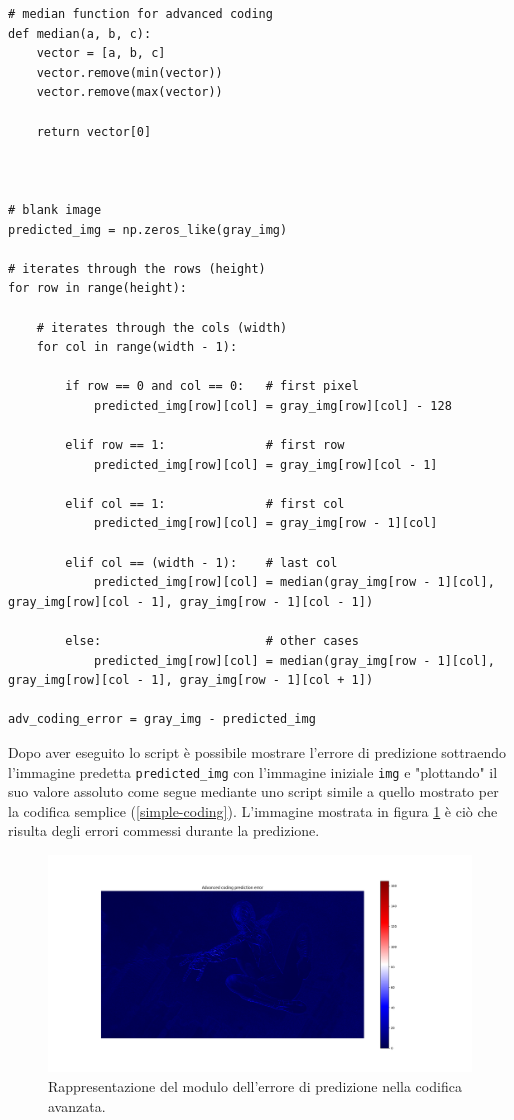 \begin{lstlisting}
# median function for advanced coding
def median(a, b, c):
    vector = [a, b, c]
    vector.remove(min(vector))
    vector.remove(max(vector))
    
    return vector[0]



# blank image 
predicted_img = np.zeros_like(gray_img)

# iterates through the rows (height)
for row in range(height):

    # iterates through the cols (width)
    for col in range(width - 1):

        if row == 0 and col == 0:   # first pixel
            predicted_img[row][col] = gray_img[row][col] - 128
        
        elif row == 1:              # first row
            predicted_img[row][col] = gray_img[row][col - 1]
        
        elif col == 1:              # first col
            predicted_img[row][col] = gray_img[row - 1][col]
        
        elif col == (width - 1):    # last col
            predicted_img[row][col] = median(gray_img[row - 1][col], gray_img[row][col - 1], gray_img[row - 1][col - 1])

        else:                       # other cases
            predicted_img[row][col] = median(gray_img[row - 1][col], gray_img[row][col - 1], gray_img[row - 1][col + 1])

adv_coding_error = gray_img - predicted_img
\end{lstlisting}

\noindent Dopo aver eseguito lo script è possibile mostrare l'errore di predizione sottraendo l'immagine predetta \texttt{predicted\_img} con l'immagine iniziale \texttt{img} e "plottando" il suo valore assoluto come segue mediante uno script simile a quello mostrato per la codifica semplice (\ref{simple-coding}). L'immagine mostrata in figura \ref{fig:advanced-coding} è ciò che risulta degli errori commessi durante la predizione.

\begin{figure}[h]
    \centering
    \includegraphics[width = .9\textwidth]{hw-1/report/imgs/advanced-coding.png}
    \caption{Rappresentazione del modulo dell'errore di predizione nella codifica avanzata.}
    \label{fig:advanced-coding}
\end{figure}

